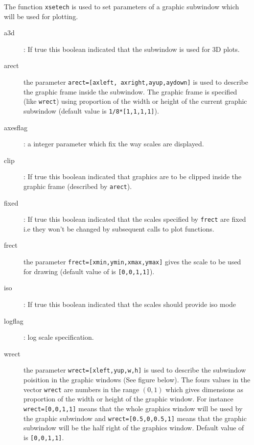 \begin{mandescription}
  The function \verb!xsetech! is used to set parameters of a graphic subwindow 
  which will be used for plotting. 
  \begin{description} 
    \item[a3d]: If true this boolean indicated that the subwindow is used for 3D plots.
    \item[arect] the parameter \verb!arect=[axleft, axright,ayup,aydown]!
      is used to describe the graphic frame inside the subwindow. The graphic frame is specified (like
      \verb!wrect!) using proportion of the width or height of the current
      graphic subwindow (default value is \verb!1/8*[1,1,1,1]!). 
    \item[axesflag]: a integer parameter which fix the way scales are displayed.
    \item[clip]: If true this boolean indicated that graphics are to be clipped inside the graphic frame 
      (described by \verb!arect!).
    \item[fixed]: If true this boolean indicated that the scales specified by \verb!frect! are fixed i.e 
      they won't be changed by subsequent calls to plot functions. 
    \item[frect] the parameter \verb!frect=[xmin,ymin,xmax,ymax]! gives the scale to be used for drawing 
      (default value of is \verb![0,0,1,1]!).
    \item[iso]: If true this boolean indicated that the scales should provide iso mode 
    \item[logflag]: log scale specification.
    \item[wrect] the parameter \verb!wrect=[xleft,yup,w,h]! is used to describe the subwindow poisition 
      in the graphic windows (See figure below).  The fours values in the vector \verb!wrect! are 
      numbers in the range $(0,1)$ which gives dimensions as proportion of the width or height of the graphic window. 
      For instance \verb!wrect=[0,0,1,1]! means that the whole graphics window will be used by the graphic subwindow
      and \verb!wrect=[0.5,0,0.5,1]! means that the graphic subwindow will be the half right of the graphics window.
      Default value of is \verb![0,0,1,1]!.
    \end{description}


\end{mandescription}
